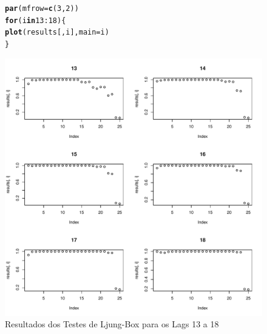 \documentclass{article}\usepackage[]{graphicx}\usepackage[]{color}
\makeatletter
\def\maxwidth{ %
  \ifdim\Gin@nat@width>\linewidth
    \linewidth
  \else
    \Gin@nat@width
  \fi
}
\newcommand{\hlnum}[1]{\textcolor[rgb]{0.686,0.059,0.569}{#1}}%
\newcommand{\hlopt}[1]{\textcolor[rgb]{0,0,0}{#1}}%
\newcommand{\hlstd}[1]{\textcolor[rgb]{0.345,0.345,0.345}{#1}}%
\newcommand{\hlkwa}[1]{\textcolor[rgb]{0.161,0.373,0.58}{\textbf{#1}}}%
\newcommand{\hlkwc}[1]{\textcolor[rgb]{0.333,0.667,0.333}{#1}}%
\newcommand{\hlkwd}[1]{\textcolor[rgb]{0.737,0.353,0.396}{\textbf{#1}}}%
\newenvironment{kframe}{%
 \def\at@end@of@kframe{}%
 \ifinner\ifhmode%
  \def\at@end@of@kframe{\end{minipage}}%
  \begin{minipage}{\columnwidth}%
 \fi\fi%
 \def\FrameCommand##1{\hskip\@totalleftmargin \hskip-\fboxsep
 \colorbox{shadecolor}{##1}\hskip-\fboxsep
     \hskip-\linewidth \hskip-\@totalleftmargin \hskip\columnwidth}%
 \MakeFramed {\advance\hsize-\width
   \@totalleftmargin\z@ \linewidth\hsize
   \@setminipage}}%
 {\par\unskip\endMakeFramed%
 \at@end@of@kframe}
\newenvironment{knitrout}{}{} %
\makeatother
\begin{document}
            \begin{figure}[H]
            \caption{Resultados dos Testes de Ljung-Box para os Lags 13 a 18}
            \centering
\begin{knitrout}
\color{fgcolor}\begin{kframe}
\begin{alltt}
\hlkwd{par}\hlstd{(}\hlkwc{mfrow} \hlstd{=} \hlkwd{c}\hlstd{(}\hlnum{3}\hlstd{,}\hlnum{2}\hlstd{))}
\hlkwa{for} \hlstd{(i} \hlkwa{in} \hlnum{13}\hlopt{:}\hlnum{18}\hlstd{)\{}
  \hlkwd{plot}\hlstd{(results[,i],} \hlkwc{main}\hlstd{=i)}
\hlstd{\}}
\end{alltt}
\end{kframe}
\includegraphics[width=\maxwidth]{figure/unnamed-chunk-95-1} 

\end{knitrout}
            \end{figure}
\end{document}
